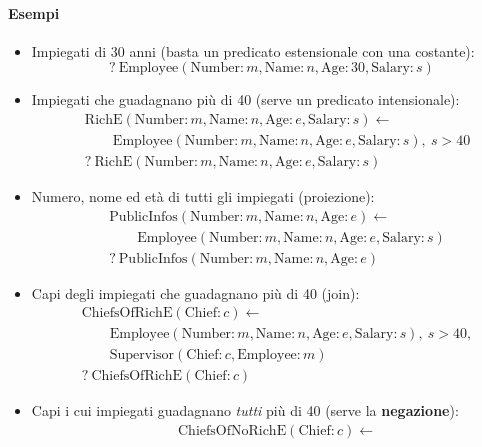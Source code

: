 \documentclass[a4paper,12pt]{article}
\begin{document}
\paragraph{Esempi}
\begin{itemize}
  \item Impiegati di 30 anni (basta un predicato estensionale con una
    costante):
    \[ ?\ \text{Employee}(\text{Number}: m, \text{Name}: n, \text{Age}: 30,
       \text{Salary}: s) \]
  \item Impiegati che guadagnano più di 40 (serve un predicato intensionale):
    \begin{align*}
      & \text{RichE}(\text{Number}: m, \text{Name}: n, \text{Age}: e,
        \text{Salary}: s) \leftarrow\\
      & \qquad \text{Employee}(\text{Number}: m, \text{Name}: n,
        \text{Age}: e, \text{Salary}: s),\ s > 40\\
      & ?\ \text{RichE}(\text{Number}: m, \text{Name}: n, \text{Age}: e,
        \text{Salary}: s)
    \end{align*}
  \item Numero, nome ed età di tutti gli impiegati (proiezione):
    \begin{align*}
      & \text{PublicInfos}(\text{Number}: m, \text{Name}: n, \text{Age}: e)
        \leftarrow\\
      & \qquad \text{Employee}(\text{Number}: m, \text{Name}: n, \text{Age}: e, \text{Salary}: s)\\
      & ?\ \text{PublicInfos}(\text{Number}: m, \text{Name}: n, \text{Age}: e)
    \end{align*}
  \item Capi degli impiegati che guadagnano più di 40 (join):
    \begin{align*}
      & \text{ChiefsOfRichE}(\text{Chief}: c) \leftarrow\\
      & \qquad \text{Employee}(\text{Number}: m, \text{Name}: n, \text{Age}: e, \text{Salary}: s),\ s > 40,\\
      & \qquad \text{Supervisor}(\text{Chief}: c, \text{Employee}: m)\\
      & ?\ \text{ChiefsOfRichE}(\text{Chief}: c)
    \end{align*}
  \item Capi i cui impiegati guadagnano \emph{tutti} più di 40 (serve la
    \textbf{negazione}):
    \begin{align*}
      & \text{ChiefsOfNoRichE}(\text{Chief}: c) \leftarrow\\

\end{align*}
\end{itemize}
\end{document}
